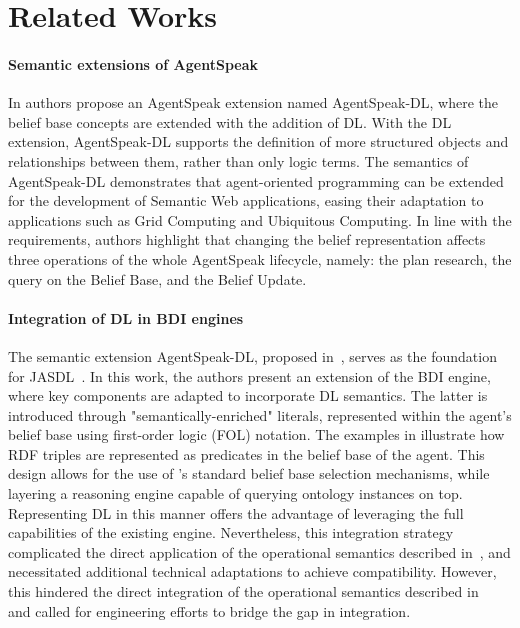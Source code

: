 \documentclass[
]{ceurart}
\begin{document}
\section{Related Works}
\label{sec:related-works}



\paragraph{Semantic extensions of AgentSpeak}
In \cite{DBLP:conf/dalt/MoreiraVBH05} authors propose an AgentSpeak extension named AgentSpeak-DL, 
where the belief base concepts are extended with the addition of \ac{DL}.
%
With the \ac{DL} extension, 
AgentSpeak-DL supports the definition of more structured objects and relationships between them, 
rather than only logic terms.
%
The semantics of AgentSpeak-DL demonstrates that agent-oriented programming can be extended for the development of Semantic Web applications, 
easing their adaptation to applications such as Grid Computing and Ubiquitous Computing.
%
In line with the requirements, 
authors highlight that changing the belief representation affects three operations of the whole AgentSpeak lifecycle, namely: the plan research, the query on the Belief Base, and the Belief Update.

\paragraph{Integration of DL in BDI engines}
The semantic extension AgentSpeak-DL, proposed in~\cite{DBLP:conf/dalt/MoreiraVBH05}, serves as the foundation for JASDL~\cite{DBLP:conf/dalt/KlapiscakB08}.
%
In this work, the authors present an extension of the \jason{} \ac{BDI} engine, where key components are adapted to incorporate \ac{DL} semantics.
%
The latter is introduced through "semantically-enriched" literals, represented within the agent's belief base using first-order logic (FOL) notation.
%
The examples in  illustrate how \ac{RDF} triples are represented as predicates in the belief base of the agent.
%
This design allows for the use of \jason{}'s standard belief base selection mechanisms, while layering a reasoning engine capable of querying ontology instances on top.
%
Representing \ac{DL} in this manner offers the advantage of leveraging the full capabilities of the existing \jason{} engine.
%
Nevertheless, this integration strategy complicated the direct application of the operational semantics described in~\cite{DBLP:conf/dalt/KlapiscakB08}, and necessitated additional technical adaptations to achieve compatibility.
%
However, 
this hindered the direct integration of the operational semantics described in~\cite{DBLP:conf/dalt/KlapiscakB08} 
and called for engineering efforts to bridge the gap in integration.
\end{document}
